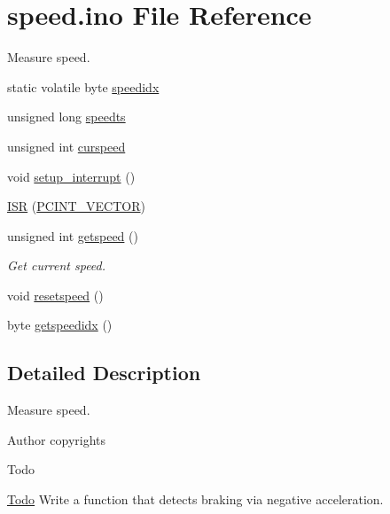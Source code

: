 \hypertarget{speed_8ino}{}\section{speed.\+ino File Reference}
\label{speed_8ino}


Measure speed.  


\begin{DoxyCompactItemize}
\item 
static volatile byte \hyperlink{group__speed_gaded4e91dd554c212e6c75ef7148a7845}{speedidx}
\item 
unsigned long \hyperlink{group__speed_ga605bafc427aaa8e9718a112441ba88a7}{speedts}
\item 
unsigned int \hyperlink{group__speed_ga63232e097931bc02aa65b3b7dadbb74b}{curspeed}
\item 
void \hyperlink{group__speed_gae87a94769934715c309733cfdf2abcb4}{setup\+\_\+interrupt} ()
\item 
\hyperlink{group__speed_ga44395845abd4a9c31e4fbe88ed717fa3}{I\+SR} (\hyperlink{group__speed_ga77b45027297b1ff40b5b1249afb852e5}{P\+C\+I\+N\+T\+\_\+\+V\+E\+C\+T\+OR})
\item 
unsigned int \hyperlink{group__speed_gafc7b1718f9b23966dfed24056f67996f}{getspeed} ()
\begin{DoxyCompactList}\small\item\em Get current speed. \end{DoxyCompactList}\item 
void \hyperlink{group__speed_ga2004678343c1f7b145dc10aae949a4ec}{resetspeed} ()
\item 
byte \hyperlink{group__speed_gaa1b4f1cc5cf5ba94e3bc38f44e0c7001}{getspeedidx} ()
\end{DoxyCompactItemize}


\subsection{Detailed Description}
Measure speed. 

\begin{DoxyAuthor}{Author}
copyrights 
\end{DoxyAuthor}
\begin{DoxyRefDesc}{Todo}
\item[\hyperlink{todo__todo000005}{Todo}]Write a function that detects braking via negative acceleration. \end{DoxyRefDesc}
